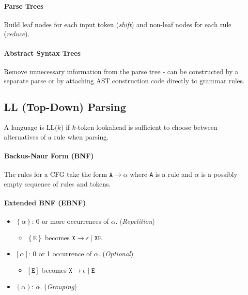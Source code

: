 \documentclass[twocolumn,english]{article}
\begin{document}
\paragraph{Parse Trees}

Build leaf nodes for each input token (\emph{shift}) and non-leaf
nodes for each rule (\emph{reduce}).

\paragraph{Abstract Syntax Trees}

Remove unnecessary information from the parse tree - can be constructed
by a separate parse or by attaching AST construction code directly
to grammar rules.

\subsection{LL (Top-Down) Parsing}

A language is LL($k$) if $k$-token lookahead is sufficient to choose
between alternatives of a rule when parsing.

\paragraph{Backus-Naur Form (BNF)}

The rules for a CFG take the form $\texttt{A}\rightarrow\alpha$ where
\texttt{A} is a rule and $\alpha$ is a possibly empty sequence of
rules and tokens.

\paragraph{Extended BNF (EBNF)}
\begin{itemize}
\item $\left\{ \alpha\right\} $: 0 or more occurrences of $\alpha$. (\emph{Repetition})
\begin{itemize}
\item $\left\{ \texttt{E}\right\} $ becomes $\texttt{X}\rightarrow\epsilon\mid\texttt{XE}$
\end{itemize}
\item $\left[\alpha\right]$: 0 or 1 occurrence of $\alpha$. (\emph{Optional})
\begin{itemize}
\item $\left[\texttt{E}\right]$ becomes $\texttt{X}\rightarrow\epsilon\mid\texttt{E}$
\end{itemize}
\item $\left(\alpha\right)$: $\alpha$. (\emph{Grouping})
\end{itemize}
\end{document}
